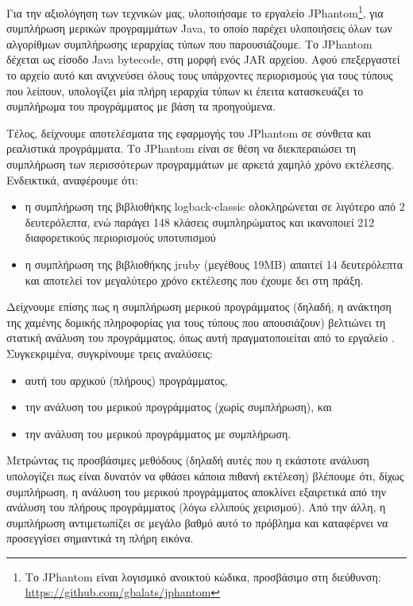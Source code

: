 Για την αξιολόγηση των τεχνικών μας, υλοποιήσαμε το εργαλείο {\en
  JPhantom}\footnote{Το {\en JPhantom} είναι λογισμικό ανοικτού
  κώδικα, προσβάσιμο στη διεύθυνση: {\en
    \url{https://github.com/gbalats/jphantom}}}, για συμπλήρωση
μερικών προγραμμάτων {\en Java}, το οποίο παρέχει υλοποιήσεις όλων των
αλγορίθμων συμπλήρωσης ιεραρχίας τύπων που παρουσιάζουμε. Το {\en
  JPhantom} δέχεται ως είσοδο {\en Java bytecode}, στη μορφή ενός {\en
  JAR} αρχείου. Αφού επεξεργαστεί το αρχείο αυτό και ανιχνεύσει όλους
τους υπάρχοντες περιορισμούς για τους τύπους που λείπουν, υπολογίζει
μία πλήρη ιεραρχία τύπων κι έπειτα κατασκευάζει το συμπλήρωμα του
προγράμματος με βάση τα προηγούμενα.

Τέλος, δείχνουμε αποτελέσματα της εφαρμογής του {\en JPhantom} σε
σύνθετα και ρεαλιστικά προγράμματα. Το {\en JPhantom} είναι σε θέση να
διεκπεραιώσει τη συμπλήρωση των περισσότερων προγραμμάτων με αρκετά
χαμηλό χρόνο εκτέλεσης. Ενδεικτικά, αναφέρουμε ότι:
\begin{itemize}
\item η συμπλήρωση της βιβλιοθήκης {\en logback-classic} ολοκληρώνεται
  σε λιγότερο από 2 δευτερόλεπτα, ενώ παράγει 148 κλάσεις
  συμπληρώματος και ικανοποιεί 212 διαφορετικούς περιορισμούς
  υποτυπισμού
\item η συμπλήρωση της βιβλιοθήκης {\en jruby} (μεγέθους {\en 19MB})
  απαιτεί 14 δευτερόλεπτα και αποτελεί τον μεγαλύτερο χρόνο εκτέλεσης
  που έχουμε δει στη πράξη.
\end{itemize}
%
Δείχνουμε επίσης πως η συμπλήρωση μερικού προγράμματος (δηλαδή, η
ανάκτηση της χαμένης δομικής πληροφορίας για τους τύπους που
απουσιάζουν) βελτιώνει τη στατική ανάλυση του προγράμματος, όπως αυτή
πραγματοποιείται από το εργαλείο {\en \doop{}}. Συγκεκριμένα,
συγκρίνουμε τρεις αναλύσεις:
\begin{itemize}
\item αυτή του αρχικού (πλήρους) προγράμματος,
\item την ανάλυση του μερικού προγράμματος (χωρίς συμπλήρωση), και
\item την ανάλυση του μερικού προγράμματος με συμπλήρωση.
\end{itemize}
Μετρώντας τις προσβάσιμες μεθόδους (δηλαδή αυτές που η εκάστοτε
ανάλυση υπολογίζει πως είναι δυνατόν να φθάσει κάποια πιθανή εκτέλεση)
βλέπουμε ότι, δίχως συμπλήρωση, η ανάλυση του μερικού προγράμματος
αποκλίνει εξαιρετικά από την ανάλυση του πλήρους προγράμματος (λόγω
ελλιπούς χειρισμού). Από την άλλη, η συμπλήρωση αντιμετωπίζει σε
μεγάλο βαθμό αυτό το πρόβλημα και καταφέρνει να προσεγγίσει σημαντικά
τη πλήρη εικόνα.


